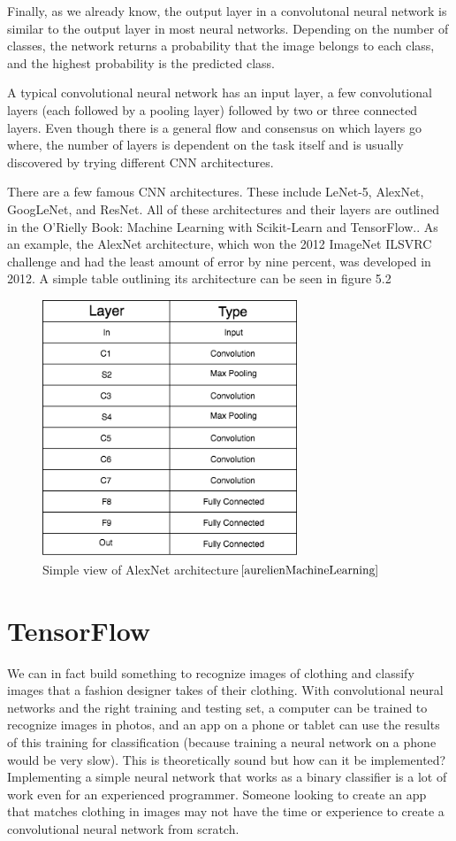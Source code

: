 \documentclass[12pt]{report} %
\begin{document}
	Finally, as we already know, the output layer in a convolutonal neural network is similar to the output layer in most neural networks. Depending on the number of classes, the network returns a probability that the image belongs to each class, and the highest probability is the predicted class. 
	
	A typical convolutional neural network has an input layer, a few convolutional layers (each followed by a pooling layer) followed by two or three connected layers. Even though there is a general flow and consensus on which layers go where, the number of layers is dependent on the task itself and is usually discovered by trying different CNN architectures.
	
	There are a few famous CNN architectures. These include LeNet-5, AlexNet, GoogLeNet, and ResNet. All of these architectures and their layers are outlined in the O'Rielly Book: Machine Learning with Scikit-Learn and TensorFlow.\cite{aurelienMachineLearning}. As an example, the AlexNet architecture, which won the 2012 ImageNet ILSVRC challenge and had the least amount of error by nine percent, was developed in 2012. A simple table outlining its architecture can be seen in figure 5.2
\begin{figure}
\centering
\includegraphics[width=3in]{alex_net_arch}
\caption[CNN Architecture: AlexNet]
	{Simple view of AlexNet architecture$\cite{aurelienMachineLearning}$}
\end{figure}		

\chapter{TensorFlow}
	We can in fact build something to recognize images of clothing and classify images that a fashion designer takes of their clothing. With convolutional neural networks and the right training and testing set, a computer can be trained to recognize images in photos, and an app on a phone or tablet can use the results of this training for classification (because training a neural network on a phone would be very slow). This is theoretically sound but how can it be implemented? Implementing a simple neural network that works as a binary classifier is a lot of work even for an experienced programmer. Someone looking to create an app that matches clothing in images may not have the time or experience to create a convolutional neural network from scratch. 
\end{document}

